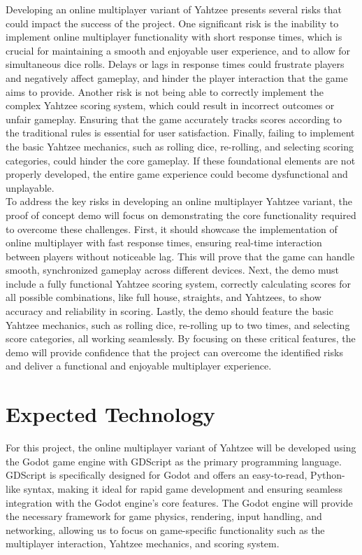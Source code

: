 \documentclass{article}
\begin{document}
Developing an online multiplayer variant of Yahtzee presents several risks that could impact the success of the project. One significant risk is the inability to implement online multiplayer functionality with short response times, which is crucial for maintaining a smooth and enjoyable user experience, and to allow for simultaneous dice rolls. Delays or lags in response times could frustrate players and negatively affect gameplay, and hinder the player interaction that the game aims to provide. Another risk is not being able to correctly implement the complex Yahtzee scoring system, which could result in incorrect outcomes or unfair gameplay. Ensuring that the game accurately tracks scores according to the traditional rules is essential for user satisfaction. Finally, failing to implement the basic Yahtzee mechanics, such as rolling dice, re-rolling, and selecting scoring categories, could hinder the core gameplay. If these foundational elements are not properly developed, the entire game experience could become dysfunctional and unplayable. \\

To address the key risks in developing an online multiplayer Yahtzee variant, the proof of concept demo will focus on demonstrating the core functionality required to overcome these challenges. First, it should showcase the implementation of online multiplayer with fast response times, ensuring real-time interaction between players without noticeable lag. This will prove that the game can handle smooth, synchronized gameplay across different devices. Next, the demo must include a fully functional Yahtzee scoring system, correctly calculating scores for all possible combinations, like full house, straights, and Yahtzees, to show accuracy and reliability in scoring. Lastly, the demo should feature the basic Yahtzee mechanics, such as rolling dice, re-rolling up to two times, and selecting score categories, all working seamlessly. By focusing on these critical features, the demo will provide confidence that the project can overcome the identified risks and deliver a functional and enjoyable multiplayer experience.\\


\section{Expected Technology}

For this project, the online multiplayer variant of Yahtzee will be developed using the Godot game engine with GDScript as the primary programming language. GDScript is specifically designed for Godot and offers an easy-to-read, Python-like syntax, making it ideal for rapid game development and ensuring seamless integration with the Godot engine's core features. The Godot engine will provide the necessary framework for game physics, rendering, input handling, and networking, allowing us to focus on game-specific functionality such as the multiplayer interaction, Yahtzee mechanics, and scoring system. \\
\end{document}
